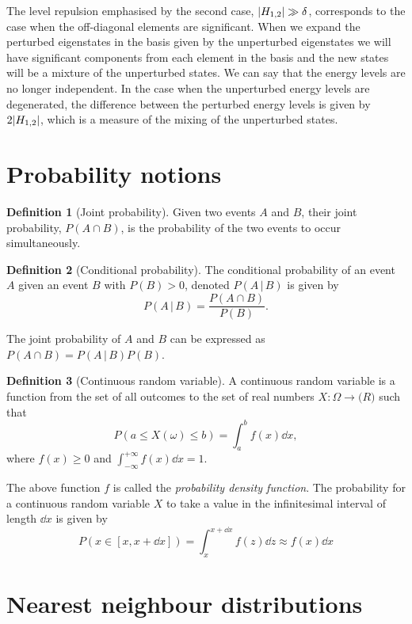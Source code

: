 \documentclass[../thesis.tex]{subfiles}
\theoremstyle{definition}
\newtheorem*{def*}{Definition}
\begin{document}
The level repulsion emphasised by the second case, \(\abs{H_{1,2}} \gg \delta \),
corresponds to the case when the off-diagonal elements are significant. When we
expand the perturbed eigenstates in the basis given by the unperturbed eigenstates
we will have significant components from each element in the basis and the new
states will be a mixture of the unperturbed states. We can say that the energy levels
are no longer independent. In the case when the unperturbed energy
levels are degenerated, the difference between the perturbed energy levels
is given by \(2 \abs{H_{1,2}}\), which is a measure of the mixing of the
unperturbed states.


\section{Probability notions}

\begin{def*}[Joint probability]
  Given two events $A$ and $B$, their joint probability, \(P(A \cap B)\), is
  the probability of the two events to occur simultaneously.
\end{def*}

\begin{def*}[Conditional probability]
  The conditional probability of an event $A$ given an event $B$ with \(P(B)>0\),
  denoted \(P(A\,|\,B)\) is given by
  \[
    P(A\,|\,B) = \frac{P(A \cap B)}{P(B)}.
  \]
\end{def*}

The joint probability of $A$ and $B$ can be expressed as
\(P(A \cap B) = P(A\,|\,B) P(B)\).

\begin{def*}[Continuous random variable]
  A continuous random variable is a function from the set of all outcomes to the
  set of real numbers \(X:\Omega \to \mathbb(R)\) such that
  \[
    P(a \leq X(\omega) \leq b) = \int_a^b f(x) \dd{x},
  \]
  where \(f(x) \geq 0\) and \(\int_{-\infty}^{+\infty}f(x)\dd{x}=1\).
\end{def*}
The above function \(f\) is called the \emph{probability density function}.
The probability for a continuous random variable $X$ to take a value in the
infinitesimal interval of length \(\dd{x}\) is given by
\begin{equation}
  \label{eq:prob-rv-in-int}
  P(x \in [x, x + \dd{x}]) = \int_x^{x+\dd{x}} f(z) \dd{z} \approx f(x)\dd{x}
\end{equation}


\section{Nearest neighbour distributions}
\end{document}
